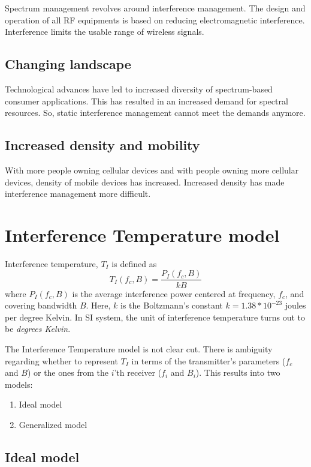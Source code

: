 \documentclass[12pt]{article}
\begin{document}
Spectrum management revolves around interference management\cite{kolodzy2006}. The design and operation of all RF equipments is based on reducing electromagnetic interference. Interference limits the usable range of wireless signals.

\subsection*{Changing landscape}

Technological advances have led to increased diversity of spectrum-based consumer applications. This has resulted in an increased demand for spectral resources. So, static interference management cannot meet the demands anymore.

\subsection*{Increased density and mobility}

With more people owning cellular devices and with people owning more cellular devices, density of mobile devices has increased. Increased density has made interference management more difficult.

\section{Interference Temperature model}
Interference temperature\cite{kolodzy2006}, $T_I$ is defined as
\begin{equation*} 
    T_I(f_c , B) = \frac{P_I(f_c , B)}{kB}
\end{equation*}
where $P_I(f_c,B)$ is the average interference power centered at frequency, $f_c$, and covering bandwidth
$B$. Here, $k$ is the Boltzmann's constant $k = 1.38 * 10^{-23} $ joules per degree Kelvin. In SI system, the unit of interference temperature turns out to be \emph{degrees Kelvin}.

The Interference Temperature model\cite{clancy2006} is not clear cut. There is ambiguity regarding whether to represent $T_I$ in terms of the transmitter's parameters ($f_c$ and $B$) or the ones from the $i$'th receiver ($f_i$ and $B_i$).
This results into two models\cite{clancy2006}:
\begin{enumerate}
    \item Ideal model
    \item Generalized model
\end{enumerate}

\subsection{Ideal model}
\end{document}
